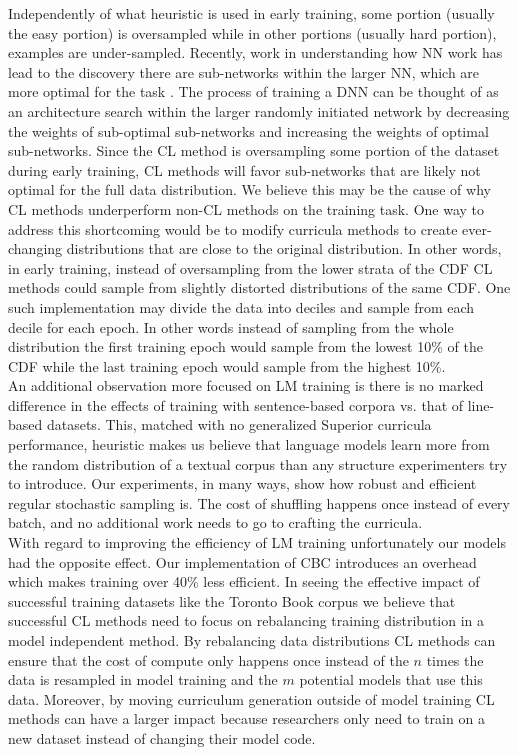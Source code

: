 Independently of what heuristic is used in early training, some portion (usually the easy portion) is oversampled while in other portions (usually hard portion), examples are under-sampled. Recently, work in understanding how NN work has lead to the discovery there are sub-networks within the larger NN, which are more optimal for the task \cite{Frankle2019TheLT}. The process of training a DNN can be thought of as an architecture search within the larger randomly initiated network by decreasing the weights of sub-optimal sub-networks and increasing the weights of optimal sub-networks. Since the CL method is oversampling some portion of the dataset during early training, CL methods will favor sub-networks that are likely not optimal for the full data distribution. We believe this may be the cause of why CL methods underperform non-CL methods on the training task. One way to address this shortcoming would be to modify curricula methods to create ever-changing distributions that are close to the original distribution. In other words, in early training, instead of oversampling from the lower strata of the CDF CL methods could sample from slightly distorted distributions of the same CDF. One such implementation may divide the data into deciles and sample from each decile for each epoch. In other words instead of sampling from the whole distribution the first training epoch would sample from the lowest 10\% of the CDF while the last training epoch would sample from the highest 10\%. \\ 
An additional observation more focused on LM training is there is no marked difference in the effects of training with sentence-based corpora vs. that of line-based datasets. This, matched with no generalized Superior curricula performance, heuristic makes us believe that language models learn more from the random distribution of a textual corpus than any structure experimenters try to introduce. Our experiments, in many ways, show how robust and efficient regular stochastic sampling is. The cost of shuffling happens once instead of every batch, and no additional work needs to go to crafting the curricula.\\
With regard to improving the efficiency of LM training unfortunately our models had the opposite effect. Our implementation of CBC introduces an overhead which makes training over 40\% less efficient. In seeing the effective impact of successful training datasets like the Toronto Book corpus we believe that successful CL methods need to focus on rebalancing training distribution in a model independent method. By rebalancing data distributions CL methods can ensure that the cost of compute only happens once instead of the $n$ times the data is resampled in model training and the $m$  potential models that use this data. Moreover, by moving curriculum generation outside of model training CL methods can have a larger impact because researchers only need to train on a new dataset instead of changing their model code. \\
